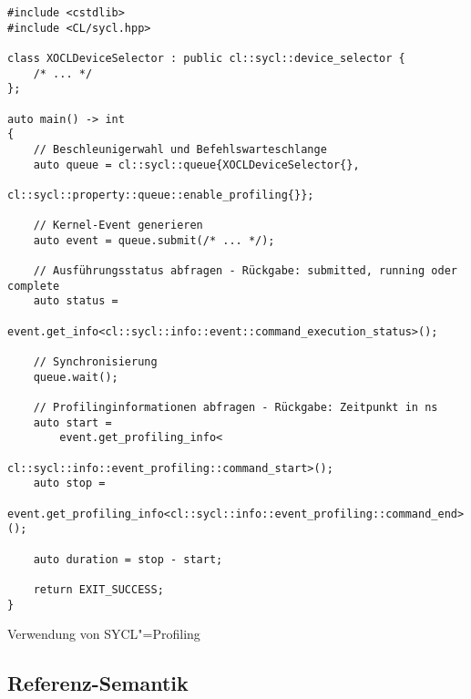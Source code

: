 \begin{code}
    \begin{verbatim}
#include <cstdlib>
#include <CL/sycl.hpp>

class XOCLDeviceSelector : public cl::sycl::device_selector {
    /* ... */
};

auto main() -> int
{
    // Beschleunigerwahl und Befehlswarteschlange
    auto queue = cl::sycl::queue{XOCLDeviceSelector{},
                                 cl::sycl::property::queue::enable_profiling{}};

    // Kernel-Event generieren
    auto event = queue.submit(/* ... */);

    // Ausführungsstatus abfragen - Rückgabe: submitted, running oder complete
    auto status =
        event.get_info<cl::sycl::info::event::command_execution_status>();

    // Synchronisierung
    queue.wait();

    // Profilinginformationen abfragen - Rückgabe: Zeitpunkt in ns
    auto start =
        event.get_profiling_info<
                            cl::sycl::info::event_profiling::command_start>();
    auto stop =
        event.get_profiling_info<cl::sycl::info::event_profiling::command_end>();

    auto duration = stop - start;

    return EXIT_SUCCESS;
}
    \end{verbatim}
    \caption{Verwendung von SYCL"=Profiling}
    \label{sycl:konzepte:profiling:src}
\end{code}

\subsection{Referenz-Semantik}

